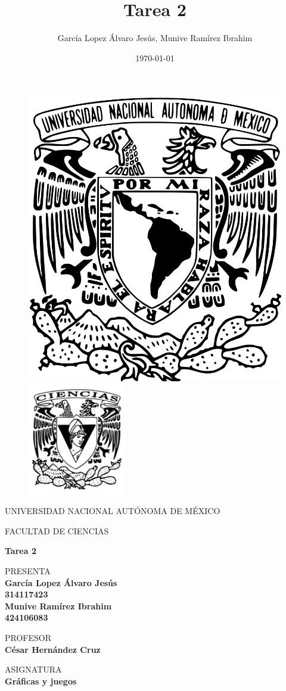 
\title{Tarea 2}
\author{García Lopez Álvaro Jesús, Munive Ramírez Ibrahim}
\date{\today}

\thispagestyle{empty}
\begin{figure}[ht]
	\includegraphics[width = 4 cm]{logo_unam.png}
	\endminipage
	\includegraphics[height = 4.9cm, width = 4 cm]{logo_ciencias.png}
	\endminipage
\end{figure}

\begin{center}
	\vspace{0.5cm}
	\LARGE
	UNIVERSIDAD NACIONAL AUTÓNOMA DE MÉXICO

	\vspace{0.5cm}
	\LARGE
	FACULTAD DE CIENCIAS

	\vspace{1.5cm}
	\Large
	\textbf{Tarea 2}

	\vspace{1cm}
	\normalsize
	PRESENTA \\
	\vspace{.3cm}
	\large
	\textbf{García Lopez Álvaro Jesús\\ 314117423 \\ Munive Ramírez Ibrahim  \\ 424106083}

	\vspace{1cm}
	\normalsize
	PROFESOR \\
	\vspace{.3cm}
	\large
	\textbf{César Hernández Cruz}

	\vspace{1cm}
	\normalsize
	ASIGNATURA \\
	\vspace{.3cm}
	\large
	\textbf{Gráficas y juegos}

	\vspace{1cm}
\end{center}

\newpage
